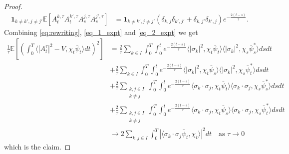 \documentclass[10pt,a4paper]{amsart}
\newcommand{\one}{\bm{1}}
\begin{document}
\begin{proof}
\begin{align}
\one_{k\neq k', j\neq j'}\mathbb{E}\left[A^{k,\tau}_tA^{k',\tau}_tA^{j,\tau}_s A^{j',\tau}_s \right]&=\one_{k\neq k', j\neq j'}\left(\delta_{k,j}\delta_{k',j'}+\delta_{k,j'}\delta_{k',j}\right)\label{eq_2_expt}e^{-\frac{2(t-s)}{\tau}}.
\end{align}
Combining \eqref{eq:rewriting}, \eqref{eq_1_expt} and \eqref{eq_2_expt} we get
\begin{align*}
 \frac{1}{\tau}\mathbb{E}\left[\left(\int_0^T \langle |A^\tau_t|^2-V, \chi_t\bar{\psi}_t\rangle dt\right)^2\right]&=\frac{2}{\tau}\sum_{k\in I}\int_0^T\int_0^t 
e^{-\frac{2(t-s)}{\tau}}
\langle |\sigma_k|^2, \chi_t\bar{\psi}_t\rangle 
\langle |\sigma_k|^2, \chi_s \bar{\psi}^*_s\rangle ds dt\\ & +\frac{2}{\tau}\sum_{k\in I}\int_0^T\int_0^t 
e^{-\frac{2(t-s)}{\tau}}
\langle |\sigma_k|^2, \chi_t\bar{\psi}_s\rangle 
\langle |\sigma_k|^2, \chi_s \bar{\psi}^*_t\rangle ds dt\\ & +\frac{2}{\tau}\sum_{\substack{k,j\in I\\ k\neq j}}\int_0^T \int_0^t e^{-\frac{2(t-s)}{\tau}}\langle \sigma_k \cdot\sigma_j,\chi_t\bar{\psi}_t\rangle \langle \sigma_k\cdot \sigma_j,\chi_s\bar{\psi}^*_s\rangle ds dt\\ &+\frac{2}{\tau}\sum_{\substack{k,j\in I\\ k\neq j}}\int_0^T \int_0^t e^{-\frac{2(t-s)}{\tau}}\langle \sigma_k \cdot\sigma_j,\chi_t\bar{\psi}_s\rangle \langle \sigma_k\cdot \sigma_j,\chi_s\bar{\psi}_t^*\rangle ds dt\\ & \rightarrow 2 \sum_{k,j\in I}\int_0^T |\langle \sigma_k\cdot\sigma_j \bar{\psi}_t, \chi_t \rangle|^2dt\quad\text{as }\tau\rightarrow 0
\end{align*}
which is the claim.
\end{proof}
\end{document}
